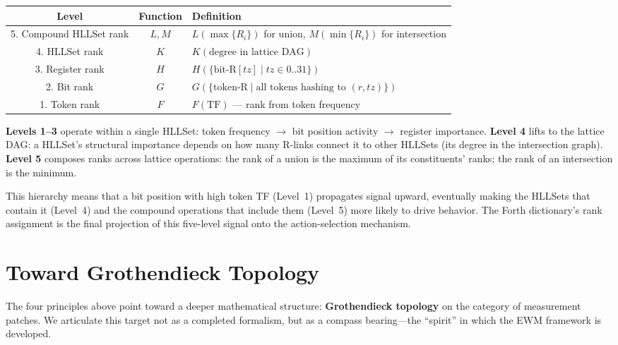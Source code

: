 \documentclass[11pt,a4paper]{article}
\theoremstyle{remark}
\begin{document}
\begin{center}
\begin{tabular}{@{}ccl@{}}
\toprule
\textbf{Level} & \textbf{Function} & \textbf{Definition} \\
\midrule
5. Compound HLLSet rank & $L, M$ & $L(\max\{R_i\})$ for union,
                                    $M(\min\{R_i\})$ for intersection \\
4. HLLSet rank           & $K$     & $K(\text{degree in lattice DAG})$ \\
3. Register rank         & $H$     & $H(\{\text{bit-R}[tz] \mid tz \in 0..31\})$ \\
2. Bit rank              & $G$     & $G(\{\text{token-R} \mid \text{all tokens hashing to }(r, tz)\})$ \\
1. Token rank            & $F$     & $F(\text{TF})$ --- rank from token frequency \\
\bottomrule
\end{tabular}
\end{center}

\textbf{Levels 1--3} operate within a single HLLSet: token frequency $\to$ bit
position activity $\to$ register importance.  \textbf{Level 4} lifts to the lattice
DAG: a HLLSet's structural importance depends on how many R-links connect it to other
HLLSets (its degree in the intersection graph).  \textbf{Level 5} composes ranks
across lattice operations: the rank of a union is the maximum of its constituents'
ranks; the rank of an intersection is the minimum.

This hierarchy means that a bit position with high token TF (Level~1) propagates
signal upward, eventually making the HLLSets that contain it (Level~4) and the
compound operations that include them (Level~5) more likely to drive behavior.  The
Forth dictionary's rank assignment is the final projection of this five-level signal
onto the action-selection mechanism.

\section{Toward Grothendieck Topology}
\label{sec:gt}

The four principles above point toward a deeper mathematical structure:
\textbf{Grothendieck topology} \cite{grothendieck1972} on the category of measurement
patches. We articulate this target not as a completed formalism, but as a compass
bearing---the ``spirit'' in which the EWM framework is developed.
\end{document}
